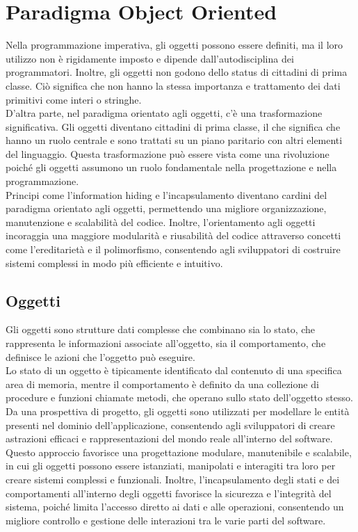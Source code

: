\documentclass{article}
\begin{document}
	\newpage
	\section{Paradigma Object Oriented}
	Nella programmazione imperativa, gli oggetti possono essere definiti, ma il loro utilizzo non è rigidamente imposto e dipende dall'autodisciplina dei programmatori. Inoltre, gli oggetti non godono dello status di cittadini di prima classe. Ciò significa che non hanno la stessa importanza e trattamento dei dati primitivi come interi o stringhe.
	\vspace{\baselineskip} \\
	D'altra parte, nel paradigma orientato agli oggetti, c'è una trasformazione significativa. Gli oggetti diventano cittadini di prima classe, il che significa che hanno un ruolo centrale e sono trattati su un piano paritario con altri elementi del linguaggio. Questa trasformazione può essere vista come una rivoluzione poiché gli oggetti assumono un ruolo fondamentale nella progettazione e nella programmazione. 
	\vspace{\baselineskip} \\
	Principi come l'information hiding e l'incapsulamento diventano cardini del paradigma orientato agli oggetti, permettendo una migliore organizzazione, manutenzione e scalabilità del codice. Inoltre, l'orientamento agli oggetti incoraggia una maggiore modularità e riusabilità del codice attraverso concetti come l'ereditarietà e il polimorfismo, consentendo agli sviluppatori di costruire sistemi complessi in modo più efficiente e intuitivo.
	
	\subsection{Oggetti}
	Gli oggetti sono strutture dati complesse che combinano sia lo stato, che rappresenta le informazioni associate all'oggetto, sia il comportamento, che definisce le azioni che l'oggetto può eseguire. 
	\vspace{\baselineskip}\\
	Lo stato di un oggetto è tipicamente identificato dal contenuto di una specifica area di memoria, mentre il comportamento è definito da una collezione di procedure e funzioni chiamate metodi, che operano sullo stato dell'oggetto stesso.
	\vspace{\baselineskip}\\
	Da una prospettiva di progetto, gli oggetti sono utilizzati per modellare le entità presenti nel dominio dell'applicazione, consentendo agli sviluppatori di creare astrazioni efficaci e rappresentazioni del mondo reale all'interno del software. Questo approccio favorisce una progettazione modulare, manutenibile e scalabile, in cui gli oggetti possono essere istanziati, manipolati e interagiti tra loro per creare sistemi complessi e funzionali. Inoltre, l'incapsulamento degli stati e dei comportamenti all'interno degli oggetti favorisce la sicurezza e l'integrità del sistema, poiché limita l'accesso diretto ai dati e alle operazioni, consentendo un migliore controllo e gestione delle interazioni tra le varie parti del software.
\end{document}
